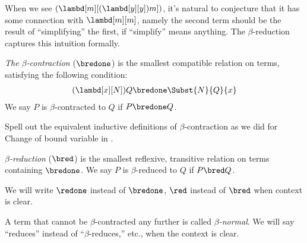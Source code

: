 \documentclass[../../../include/open-logic-section]{subfiles}
\begin{document}

When we see $(\lambd[m][(\lambd[y][y]) m])$, it's natural to
conjecture that it has some connection with $\lambd[m][m]$,
namely the second term should be the result of ``simplifying'' the first, if
``simplify'' means anything. The $\beta$-reduction captures this
intuition formally.

\begin{defn} 
  \emph{The $\beta$-contraction} ($\bredone$) is the smallest compatible
  relation on terms, satisfying the following condition:
  \begin{align*}
    (\lambd[x][N])Q \bredone \Subst{N}{Q}{x} 
  \end{align*}
  We say $P$ is $\beta$-contracted to $Q$ if $P \bredone Q$. 
\end{defn}

\begin{prob} 
  Spell out the equivalent inductive definitions of $\beta$-contraction as we
  did for Change of bound variable in .
\end{prob}
  
\begin{defn} 
  \emph{$\beta$-reduction} ($\bred$) is the smallest reflexive, transitive
  relation on terms containing $\bredone$.
  We say $P$ is $\beta$-reduced to $Q$ if $P \bred Q$.
\end{defn}
We will write $\redone$ instead of $\bredone$, $\red$ instead of
$\bred$ when context is clear.

\begin{defn}
A term that cannot be $\beta$-contracted any further is called 
\emph{$\beta$-normal}. We will say ``reduces'' instead of ``$\beta$-reduces,''
etc., when the context is clear.
\end{defn}
\end{document}
